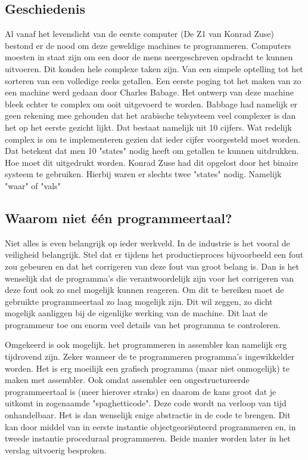 \documentclass[11pt,a4paper]{article}
\begin{document}
\subsection{Geschiedenis}
Al vanaf het levenslicht van de eerste computer (De Z1 van Konrad Zuse) bestond er de nood om deze geweldige machines te programmeren. Computers moesten in staat zijn om een door de mens neergeschreven opdracht te kunnen uitvoeren. Dit konden hele complexe taken zijn. Van een simpele optelling tot het sorteren van een volledige reeks getallen. Een eerste poging tot het maken van zo een machine werd gedaan door Charles Babage. Het ontwerp van deze machine bleek echter te complex om ooit uitgevoerd te worden. Babbage had namelijk er geen rekening mee gehouden dat het arabische telsysteem veel complexer is dan het op het eerste gezicht lijkt. Dat bestaat namelijk uit 10 cijfers. Wat redelijk complex is om te implementeren gezien dat ieder cijfer voorgesteld moet worden. Dat betekent dat men 10 "states" nodig heeft om getallen te kunnen uitdrukken. Hoe moet dit uitgedrukt worden. Konrad Zuse had dit opgelost door het binaire systeem te gebruiken. Hierbij waren er slechts twee "states" nodig. Namelijk "waar" of "vals"

\subsection{Waarom niet één programmeertaal?}
Niet alles is even belangrijk op ieder werkveld. In de industrie is het vooral de veiligheid belangrijk. Stel dat er tijdens het productieproces bijvoorbeeld een fout zou gebeuren en dat het corrigeren van deze fout van groot belang is. Dan is het wenselijk dat de programma's die verantwoordelijk zijn voor het corrigeren van deze fout ook zo snel mogelijk kunnen reageren. Om dit te bereiken moet de gebruikte programmeertaal zo laag mogelijk zijn. Dit wil zeggen, zo dicht mogelijk aanliggen bij de eigenlijke werking van de machine. Dit laat de programmeur toe om enorm veel details van het programma te controleren.

Omgekeerd is ook mogelijk. het programmeren in assembler kan namelijk erg tijdrovend zijn. Zeker wanneer de te programmeren programma's ingewikkelder worden. Het is erg moeilijk een grafisch programma (maar niet onmogelijk) te maken met assembler. Ook omdat assembler een ongestructureerde programmeertaal is (meer hierover straks) en daarom de kans groot dat je uitkomt in zogenaamde "spaghetticode". Deze code wordt na verloop van tijd onhandelbaar. Het is dan wenselijk enige abstractie in de code te brengen. Dit kan door middel van in eerste instantie objectgeoriënteerd programmeren en, in tweede instantie proceduraal programmeren. Beide manier worden later in het verslag uitvoerig besproken.
\end{document}
